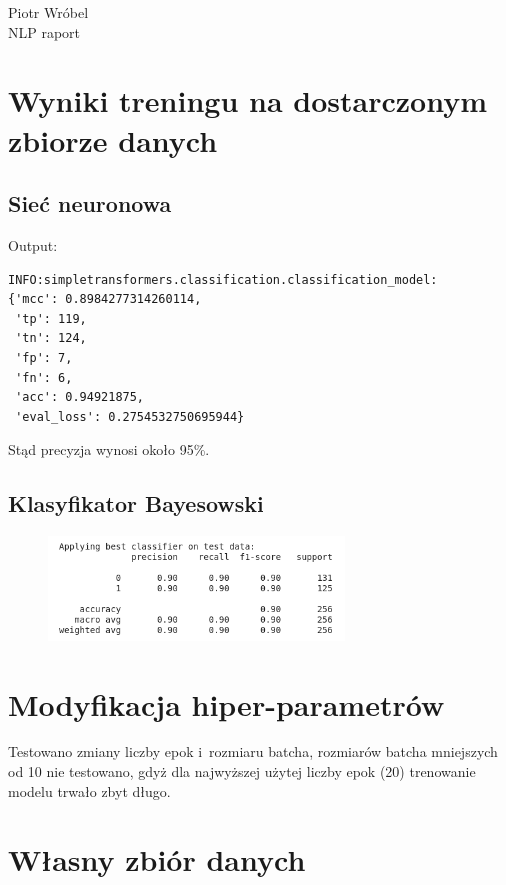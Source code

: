 \documentclass[12pt, a4paper]{mwart}
\begin{document}
\begin{center}
Piotr Wróbel\\
NLP \ppauza raport
\end{center}
  
\section{Wyniki treningu na dostarczonym zbiorze danych}

\subsection{Sieć neuronowa}

Output:
\begin{lstlisting}
INFO:simpletransformers.classification.classification_model:
{'mcc': 0.8984277314260114, 
 'tp': 119, 
 'tn': 124, 
 'fp': 7, 
 'fn': 6, 
 'acc': 0.94921875, 
 'eval_loss': 0.2754532750695944}
\end{lstlisting}

Stąd precyzja wynosi około 95\%.

\subsection{Klasyfikator Bayesowski}

\begin{figure}[ht]
  \centering
  \includegraphics[width=0.7\textwidth]{images/bayes.png}
\end{figure}

\section{Modyfikacja hiper-parametrów}

Testowano zmiany liczby epok i~rozmiaru batcha, rozmiarów batcha mniejszych od 10 nie testowano, gdyż dla najwyższej użytej liczby epok (20) trenowanie modelu trwało zbyt długo.

\section{Własny zbiór danych}
\end{document}
